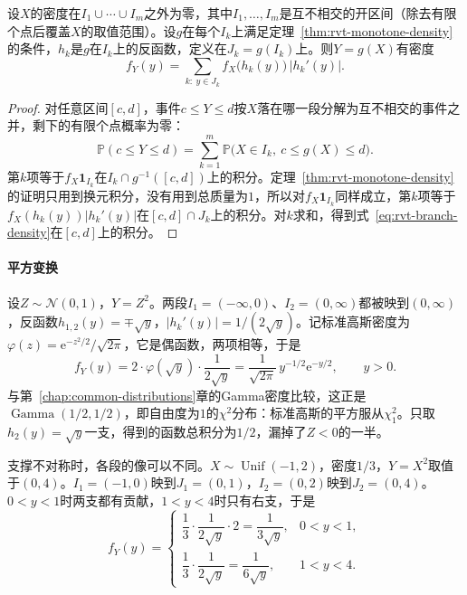 \begin{theorem}[多分支变换的密度]
\label{thm:rvt-branch-density}
设$X$的密度在$I_1\cup\cdots\cup I_m$之外为零，其中$I_1,\ldots,I_m$是互不相交的开区间（除去有限个点后覆盖$X$的取值范围）。设$g$在每个$I_k$上满足定理~\ref{thm:rvt-monotone-density}的条件，$h_k$是$g$在$I_k$上的反函数，定义在$J_k=g(I_k)$上。则$Y=g(X)$有密度
\begin{equation}
 f_Y(y)=\sum_{k:\ y\in J_k}f_X\bigl(h_k(y)\bigr)\,\lvert h_k'(y)\rvert .
 \label{eq:rvt-branch-density}
\end{equation}
\end{theorem}

\begin{proof}
对任意区间$[c,d]$，事件$c\leq Y\leq d$按$X$落在哪一段分解为互不相交的事件之并，剩下的有限个点概率为零：
\[
 \mathbb{P}(c\leq Y\leq d)=\sum_{k=1}^{m}\mathbb{P}\bigl(X\in I_k,\ c\leq g(X)\leq d\bigr) .
\]
第$k$项等于$f_X\mathbf{1}_{I_k}$在$I_k\cap g^{-1}([c,d])$上的积分。定理~\ref{thm:rvt-monotone-density}的证明只用到换元积分，没有用到总质量为$1$，所以对$f_X\mathbf{1}_{I_k}$同样成立，第$k$项等于$f_X(h_k(y))\lvert h_k'(y)\rvert$在$[c,d]\cap J_k$上的积分。对$k$求和，得到式~\eqref{eq:rvt-branch-density}在$[c,d]$上的积分。
\end{proof}

\paragraph{平方变换}
设$Z\sim\mathcal{N}(0,1)$，$Y=Z^2$。两段$I_1=(-\infty,0)$、$I_2=(0,\infty)$都被映到$(0,\infty)$，反函数$h_{1,2}(y)=\mp\sqrt{y}$，$\lvert h_k'(y)\rvert=1/(2\sqrt{y})$。记标准高斯密度为$\varphi(z)=\mathrm{e}^{-z^2/2}/\sqrt{2\pi}$，它是偶函数，两项相等，于是
\begin{equation}
 f_Y(y)=2\cdot\varphi(\sqrt{y})\cdot\frac{1}{2\sqrt{y}}=\frac{1}{\sqrt{2\pi}}\,y^{-1/2}\mathrm{e}^{-y/2},\qquad y>0 .
 \label{eq:rvt-chi2-one}
\end{equation}
与第~\ref{chap:common-distributions}章的Gamma密度比较，这正是$\operatorname{Gamma}(1/2,1/2)$，即自由度为$1$的$\chi^2$分布：标准高斯的平方服从$\chi^2_1$。只取$h_2(y)=\sqrt{y}$一支，得到的函数总积分为$1/2$，漏掉了$Z<0$的一半。

支撑不对称时，各段的像可以不同。$X\sim\operatorname{Unif}(-1,2)$，密度$1/3$，$Y=X^2$取值于$(0,4)$。$I_1=(-1,0)$映到$J_1=(0,1)$，$I_2=(0,2)$映到$J_2=(0,4)$。$0<y<1$时两支都有贡献，$1<y<4$时只有右支，于是
\[
 f_Y(y)=
 \begin{cases}
  \dfrac13\cdot\dfrac{1}{2\sqrt{y}}\cdot2=\dfrac{1}{3\sqrt{y}}, & 0<y<1,\\
  \dfrac13\cdot\dfrac{1}{2\sqrt{y}}=\dfrac{1}{6\sqrt{y}}, & 1<y<4 .
 \end{cases}
\]

